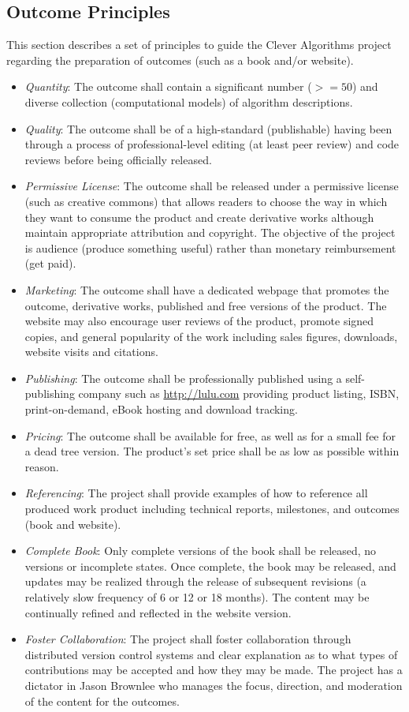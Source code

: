 \documentclass[a4paper, 11pt]{article}
\begin{document}
\subsection{Outcome Principles}
This section describes a set of principles to guide the Clever Algorithms project regarding the preparation of outcomes (such as a book and/or website).

\begin{itemize}
	\item \emph{Quantity}: The outcome shall contain a significant number ($>=50$) and diverse collection (computational models) of algorithm descriptions.
	\item \emph{Quality}: The outcome shall be of a high-standard (publishable) having been through a process of professional-level editing (at least peer review) and code reviews before being officially released. 
	\item \emph{Permissive License}: The outcome shall be released under a permissive license (such as creative commons) that allows readers to choose the way in which they want to consume the product and create derivative works although maintain appropriate attribution and copyright. The objective of the project is audience (produce something useful) rather than monetary reimbursement (get paid). 
	\item \emph{Marketing}: The outcome shall have a dedicated webpage that promotes the outcome, derivative works, published and free versions of the product. The website may also encourage user reviews of the product, promote signed copies, and general popularity of the work including sales figures, downloads, website visits and citations.
	\item \emph{Publishing}: The outcome shall be professionally published using a self-publishing company such as \url{http://lulu.com} providing product listing, ISBN, print-on-demand, eBook hosting and download tracking.
	\item \emph{Pricing}: The outcome shall be available for free, as well as for a small fee for a dead tree version. The product's set price shall be as low as possible within reason.
	\item \emph{Referencing}: The project shall provide examples of how to reference all produced work product including technical reports, milestones, and outcomes (book and website).
	\item \emph{Complete Book}: Only complete versions of the book shall be released, no versions or incomplete states. Once complete, the book  may be released, and updates may be realized through the release of subsequent revisions (a relatively slow frequency of 6 or 12 or 18 months). The content may be continually refined and reflected in the website version.
	\item \emph{Foster Collaboration}: The project shall foster collaboration through distributed version control systems and clear explanation as to what types of contributions may be accepted and how they may be made. The project has a dictator in Jason Brownlee who manages the focus, direction, and moderation of the content for the outcomes.
\end{itemize}




\end{document}
